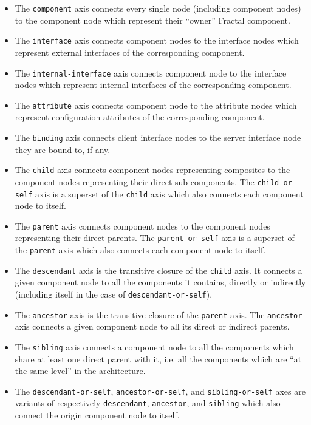 \documentclass[a4paper,12pt]{report}
\newcommand{\axis}[1]{\texttt{#1}}
\begin{document}
\begin{itemize}
\item The \axis{component} axis connects every single node (including component nodes) to
  the component node which represent their ``owner'' Fractal component.
\item The \axis{interface} axis connects component nodes to the interface nodes which
  represent external interfaces of the corresponding component.
\item The \axis{internal-interface} axis connects component node to the interface nodes
  which represent internal interfaces of the corresponding component.
\item The \axis{attribute} axis connects component node to the attribute nodes which
  represent configuration attributes of the corresponding component.
\item The \axis{binding} axis connects client interface nodes to the server interface node
  they are bound to, if any.
\item The \axis{child} axis connects component nodes representing composites to the
  component nodes representing their direct sub-components. The \axis{child-or\--self} axis
  is a superset of the \axis{child} axis which also connects each component node to
  itself.
\item The \axis{parent} axis connects component nodes to the component nodes representing
  their direct parents. The \axis{parent-or-self} axis is a superset of the \axis{parent}
  axis which also connects each component node to itself.
\item The \axis{descendant} axis is the transitive closure of the \axis{child} axis. It
  connects a given component node to all the components it contains, directly or
  indirectly (including itself in the case of \axis{descendant-or-self}).
\item The \axis{ancestor} axis is the transitive closure of the \axis{parent} axis. The
  \axis{ancestor} axis connects a given component node to all its direct or indirect
  parents.
\item The \axis{sibling} axis connects a component node to all the components which share
  at least one direct parent with it, i.e. all the components which are ``at the same
  level'' in the architecture.
\item The \axis{descendant-or-self}, \axis{ancestor-or-self}, and \axis{sibling-or-self}
  axes are variants of respectively \axis{descendant}, \axis{ancestor}, and \axis{sibling}
  which also connect the origin component node to itself.
\end{itemize}
\end{document}
